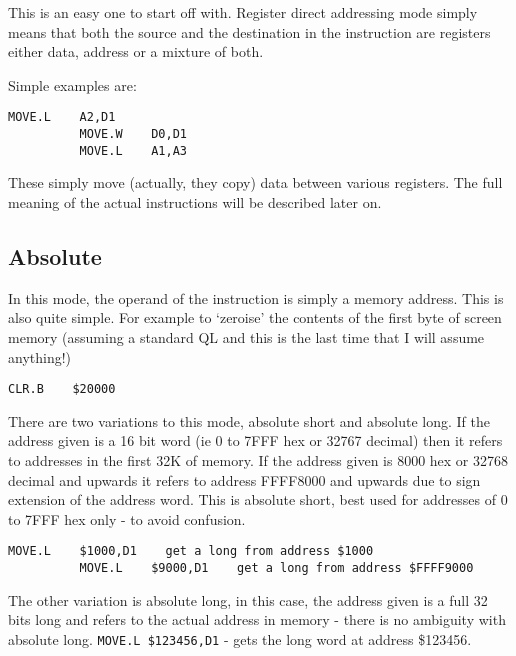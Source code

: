This is an easy one to start off with. Register direct addressing
      mode simply means that both the source and the destination in the
      instruction are registers either data, address or a mixture of
      both.

Simple examples are:

\begin{lstlisting}[firstnumber=1,]
          MOVE.L    A2,D1
          MOVE.W    D0,D1
          MOVE.L    A1,A3 
\end{lstlisting}

These simply move (actually, they copy) data between various
      registers. The full meaning of the actual instructions will be described
      later on.

\subsection{Absolute}\address{Absolute}

In this mode, the operand of the instruction is simply a memory
      address. This is also quite simple. For example to `zeroise' the
      contents of the first byte of screen memory (assuming a standard QL and
      this is the last time that I will assume anything!)

\begin{lstlisting}[firstnumber=1,]
          CLR.B    $20000  
\end{lstlisting}

There are two variations to this mode, absolute short and absolute
      long. If the address given is a 16 bit word (ie 0 to 7FFF hex or 32767
      decimal) then it refers to addresses in the first 32K of memory. If the
      address given is 8000 hex or 32768 decimal and upwards it refers to
      address FFFF8000 and upwards due to sign extension of the address word.
      This is absolute short, best used for addresses of 0 to 7FFF hex only -{}
      to avoid confusion.

\begin{lstlisting}[firstnumber=1,]
          MOVE.L    $1000,D1    get a long from address $1000
          MOVE.L    $9000,D1    get a long from address $FFFF9000  
\end{lstlisting}

The other variation is absolute long, in this case, the address
      given is a full 32 bits long and refers to the actual address in memory
      -{} there is no ambiguity with absolute long. \lstinline{MOVE.L $123456,D1} -{} gets the
      long word at address \$123456.

